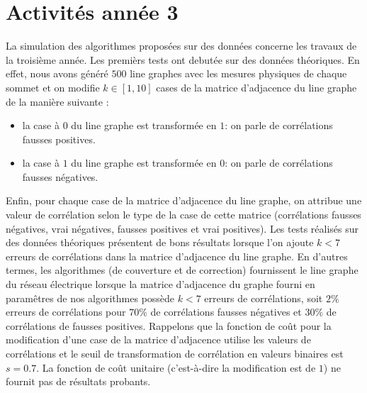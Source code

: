 \documentclass[onecolumn, 12pt]{article}
\begin{document}
\section{Activit\'es ann\'ee 3}
La simulation des algorithmes propos\'ees sur des donn\'ees concerne les travaux de la troisi\`eme ann\'ee. 
Les premi\`ers tests ont debut\'ee sur des donn\'ees th\'eoriques.
En effet, nous avons g\'en\'er\'e $500$ line graphes avec les mesures physiques de chaque sommet et on modifie $k \in [1,10]$ cases de la matrice d'adjacence du line graphe de la mani\`ere suivante :
\begin{itemize}
	\item la case \`a $0$ du line graphe est transform\'ee en $1$: on parle de corr\'elations fausses positives.
	\item la case \`a $1$ du line graphe est transform\'ee en $0$: on parle de corr\'elations fausses n\'egatives.
\end{itemize}
Enfin, pour chaque case de la matrice d'adjacence du line graphe, on attribue une valeur de corr\'elation selon le type de la case de cette matrice (corr\'elations fausses n\'egatives, vrai n\'egatives, fausses positives et vrai positives).
\newline
Les tests r\'ealis\'es sur des donn\'ees th\'eoriques pr\'esentent de bons r\'esultats lorsque l'on ajoute $k < 7$ erreurs de corr\'elations dans la matrice d'adjacence du line graphe.
En d'autres termes, les algorithmes (de couverture et de correction) fournissent le line graphe du r\'eseau \'electrique lorsque la matrice d'adjacence du graphe fourni en param\^etres de nos algorithmes poss\`ede $k < 7$ erreurs de corr\'elations, soit $2\%$ erreurs de corr\'elations pour $70\%$ de corr\'elations fausses n\'egatives et $30\%$ de corr\'elations de fausses positives.
\newline
Rappelons que la fonction de co\^ut pour la modification d'une case de la matrice d'adjacence utilise les valeurs de corr\'elations et le seuil de transformation de corr\'elation en valeurs binaires est $s = 0.7$. La fonction de co\^ut unitaire (c'est-\`a-dire la modification est de $1$) ne fournit pas de r\'esultats probants.
\newline
\end{document}
